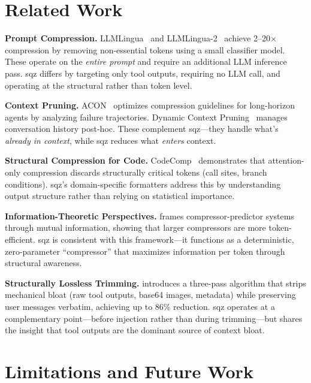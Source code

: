 \documentclass[10pt,twocolumn]{article}
\begin{document}
\section{Related Work}

\textbf{Prompt Compression.} LLMLingua~\cite{jiang2023llmlingua} and LLMLingua-2~\cite{pan2024llmlingua2} achieve 2--20$\times$ compression by removing non-essential tokens using a small classifier model. These operate on the \emph{entire prompt} and require an additional LLM inference pass. sqz differs by targeting only tool outputs, requiring no LLM call, and operating at the structural rather than token level.

\textbf{Context Pruning.} ACON~\cite{acon2024} optimizes compression guidelines for long-horizon agents by analyzing failure trajectories. Dynamic Context Pruning~\cite{anagnostidis2023dynamic} manages conversation history post-hoc. These complement sqz---they handle what's \emph{already in context}, while sqz reduces what \emph{enters} context.

\textbf{Structural Compression for Code.} CodeComp~\cite{chen2025codecomp} demonstrates that attention-only compression discards structurally critical tokens (call sites, branch conditions). sqz's domain-specific formatters address this by understanding output structure rather than relying on statistical importance.

\textbf{Information-Theoretic Perspectives.} \cite{infotheory2024} frames compressor-predictor systems through mutual information, showing that larger compressors are more token-efficient. sqz is consistent with this framework---it functions as a deterministic, zero-parameter ``compressor'' that maximizes information per token through structural awareness.

\textbf{Structurally Lossless Trimming.} \cite{dag2025} introduces a three-pass algorithm that strips mechanical bloat (raw tool outputs, base64 images, metadata) while preserving user messages verbatim, achieving up to 86\% reduction. sqz operates at a complementary point---before injection rather than during trimming---but shares the insight that tool outputs are the dominant source of context bloat.

\section{Limitations and Future Work}
\end{document}
